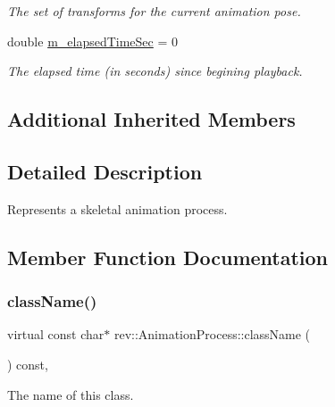 \begin{Indent}
\begin{DoxyCompactItemize}
\begin{DoxyCompactList}\small\item\em The set of transforms for the current animation pose. \end{DoxyCompactList}\item 
\mbox{\label{classrev_1_1_animation_process_ac021537b031e1f53f05a26019de4def9}} 
double \mbox{\hyperlink{classrev_1_1_animation_process_ac021537b031e1f53f05a26019de4def9}{m\+\_\+elapsed\+Time\+Sec}} = 0
\begin{DoxyCompactList}\small\item\em The elapsed time (in seconds) since begining playback. \end{DoxyCompactList}\end{DoxyCompactItemize}
\end{Indent}
\subsection*{Additional Inherited Members}


\subsection{Detailed Description}
Represents a skeletal animation process. 

\subsection{Member Function Documentation}
\mbox{\label{classrev_1_1_animation_process_a1956615907f3d2d32318d91d21a0df80}} 
\subsubsection{\texorpdfstring{className()}{className()}}
{\footnotesize\ttfamily virtual const char$\ast$ rev\+::\+Animation\+Process\+::class\+Name (\begin{DoxyParamCaption}{ }\end{DoxyParamCaption}) const\hspace{0.3cm}{\ttfamily [inline]}, {\ttfamily [virtual]}}



The name of this class. 

